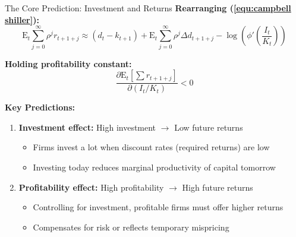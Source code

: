 \documentclass{beamer}
\begin{document}
\begin{frame}{The Core Prediction: Investment and Returns}
    \textbf{Rearranging (\ref{equ:campbell shiller}):}
    \begin{equation*}
        \mathrm{E}_t \sum_{j=0}^{\infty} \rho^j r_{t+1+j} \approx (d_t - k_{t+1}) + \mathrm{E}_t \sum_{j=0}^{\infty} \rho^j \Delta d_{t+1+j} - \log\left(\phi'\left(\frac{I_t}{K_t}\right)\right)
    \end{equation*}
    
    \textbf{Holding profitability constant:}
    \begin{equation*}
        \frac{\partial \mathrm{E}_t[\sum r_{t+1+j}]}{\partial (I_t/K_t)} < 0
    \end{equation*}
    
    
    \textbf{Key Predictions:}
    \begin{enumerate}
        \item \textbf{Investment effect:} High investment $\rightarrow$ Low future returns
        \begin{itemize}
            \item Firms invest a lot when discount rates (required returns) are low
            \item Investing today reduces marginal productivity of capital tomorrow
        \end{itemize}
        
        \item \textbf{Profitability effect:} High profitability $\rightarrow$ High future returns
        \begin{itemize}
            \item Controlling for investment, profitable firms must offer higher returns
            \item Compensates for risk or reflects temporary mispricing
        \end{itemize}
    \end{enumerate}
\end{frame}
\end{document}

